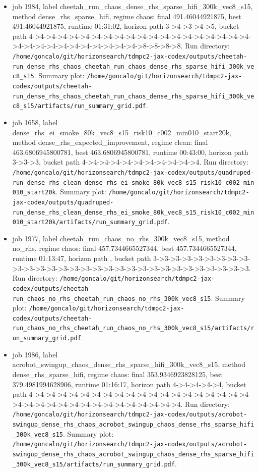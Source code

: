 \begin{itemize}
\item job 1984, label cheetah\_run\_chaos\_dense\_rhs\_sparse\_hifi\_300k\_vec8\_s15, method dense\_rhs\_sparse\_hifi, regime chaos: final 491.46044921875, best 491.46044921875, runtime 01:31:02, horizon path 3->4->3->4->5, bucket path 4->4->4->4->4->4->4->4->4->4->4->4->4->4->4->4->4->4->4->4->4->4->4->4->4->4->4->4->4->4->4->8->8->8->8. Run directory: \texttt{/home/goncalo/git/horizonsearch/tdmpc2-jax-codex/outputs/cheetah-run\_dense\_rhs\_chaos\_cheetah\_run\_chaos\_dense\_rhs\_sparse\_hifi\_300k\_vec8\_s15}. Summary plot: \texttt{/home/goncalo/git/horizonsearch/tdmpc2-jax-codex/outputs/cheetah-run\_dense\_rhs\_chaos\_cheetah\_run\_chaos\_dense\_rhs\_sparse\_hifi\_300k\_vec8\_s15/artifacts/run\_summary\_grid.pdf}.
\item job 1658, label dense\_rhs\_ei\_smoke\_80k\_vec8\_s15\_risk10\_c002\_min010\_start20k, method dense\_rhs\_expected\_improvement, regime clean: final 463.6806945800781, best 463.6806945800781, runtime 00:43:00, horizon path 3->3->3, bucket path 4->4->4->4->4->4->4->4->4->4->4. Run directory: \texttt{/home/goncalo/git/horizonsearch/tdmpc2-jax-codex/outputs/quadruped-run\_dense\_rhs\_clean\_dense\_rhs\_ei\_smoke\_80k\_vec8\_s15\_risk10\_c002\_min010\_start20k}. Summary plot: \texttt{/home/goncalo/git/horizonsearch/tdmpc2-jax-codex/outputs/quadruped-run\_dense\_rhs\_clean\_dense\_rhs\_ei\_smoke\_80k\_vec8\_s15\_risk10\_c002\_min010\_start20k/artifacts/run\_summary\_grid.pdf}.
\item job 1977, label cheetah\_run\_chaos\_no\_rhs\_300k\_vec8\_s15, method no\_rhs, regime chaos: final 457.7344665527344, best 457.7344665527344, runtime 01:13:47, horizon path , bucket path 3->3->3->3->3->3->3->3->3->3->3->3->3->3->3->3->3->3->3->3->3->3->3->3->3->3->3->3->3->3. Run directory: \texttt{/home/goncalo/git/horizonsearch/tdmpc2-jax-codex/outputs/cheetah-run\_chaos\_no\_rhs\_cheetah\_run\_chaos\_no\_rhs\_300k\_vec8\_s15}. Summary plot: \texttt{/home/goncalo/git/horizonsearch/tdmpc2-jax-codex/outputs/cheetah-run\_chaos\_no\_rhs\_cheetah\_run\_chaos\_no\_rhs\_300k\_vec8\_s15/artifacts/run\_summary\_grid.pdf}.
\item job 1986, label acrobot\_swingup\_chaos\_dense\_rhs\_sparse\_hifi\_300k\_vec8\_s15, method dense\_rhs\_sparse\_hifi, regime chaos: final 353.9346923828125, best 379.4981994628906, runtime 01:16:17, horizon path 4->4->4->4->4, bucket path 4->4->4->4->4->4->4->4->4->4->4->4->4->4->4->4->4->4->4->4->4->4->4->4->4->4->4->4->4->4->4->4->4->4->4. Run directory: \texttt{/home/goncalo/git/horizonsearch/tdmpc2-jax-codex/outputs/acrobot-swingup\_dense\_rhs\_chaos\_acrobot\_swingup\_chaos\_dense\_rhs\_sparse\_hifi\_300k\_vec8\_s15}. Summary plot: \texttt{/home/goncalo/git/horizonsearch/tdmpc2-jax-codex/outputs/acrobot-swingup\_dense\_rhs\_chaos\_acrobot\_swingup\_chaos\_dense\_rhs\_sparse\_hifi\_300k\_vec8\_s15/artifacts/run\_summary\_grid.pdf}.

\end{itemize}
